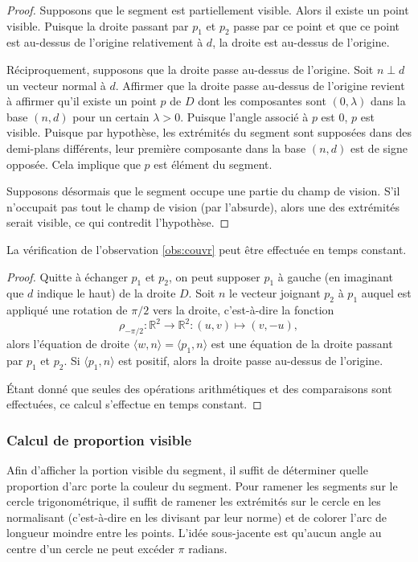 \begin{proof}
  Supposons que le segment est partiellement visible. Alors il existe
  un point visible. Puisque la droite passant par $p_1$ et $p_2$ passe
  par ce point et que ce point est au-dessus de l'origine relativement
  à $d$, la droite est au-dessus de l'origine.


  Réciproquement, supposons que la droite passe au-dessus de l'origine.
  Soit $n\perp d$ un vecteur normal à $d$. Affirmer que la droite passe
  au-dessus de l'origine revient à affirmer qu'il existe un point $p$ de $D$
  dont les composantes sont $(0, \lambda)$ dans la base $(n, d)$ pour
  un certain $\lambda>0$. Puisque l'angle associé à $p$ est $0$, $p$
  est visible. Puisque par hypothèse, les extrémités du segment sont
  supposées dans des demi-plans différents, leur première composante
  dans la base $(n, d)$ est de signe opposée. Cela implique que $p$
  est élément du segment.

  Supposons désormais que le segment occupe une partie du champ de vision.
  S'il n'occupait pas tout le champ de vision (par l'absurde), alors
  une des extrémités serait visible, ce qui contredit l'hypothèse.
\end{proof}
\begin{lem}\label{lem:couvr}
  La vérification de l'observation \ref{obs:couvr} peut être effectuée en
  temps constant.
\end{lem}
\begin{proof}
  Quitte à échanger $p_1$ et $p_2$, on peut supposer $p_1$ à gauche
  (en imaginant que $d$ indique le haut) de la droite $D$.
  Soit $n$ le vecteur joignant $p_2$ à $p_1$ auquel est appliqué
  une rotation de $\pi/2$ vers la droite, c'est-à-dire la fonction
  $$ \rho_{-\pi/2}:\mathbb R^2\to\mathbb R^2: (u, v)\mapsto (v, -u),$$
  alors l'équation de droite $\langle w, n\rangle = \langle p_1, n\rangle$
  est une équation de la droite passant par $p_1$ et $p_2$.
  Si $\langle p_1, n\rangle$ est positif, alors la droite passe au-dessus
  de l'origine.

  \'Etant donné que seules des opérations arithmétiques et des comparaisons
  sont effectuées, ce calcul s'effectue en temps constant.
\end{proof}

\subsubsection{Calcul de proportion visible}
Afin d'afficher la portion visible du segment,
il suffit de déterminer quelle proportion d'arc  porte la couleur du segment.
Pour ramener les segments sur le cercle trigonométrique, il suffit
de ramener les extrémités sur le cercle en les normalisant (c'est-à-dire en
les divisant par leur norme) et
de colorer l'arc de longueur moindre entre les points.
L'idée sous-jacente est qu'aucun angle au centre d'un cercle ne
peut excéder $\pi$ radians.


